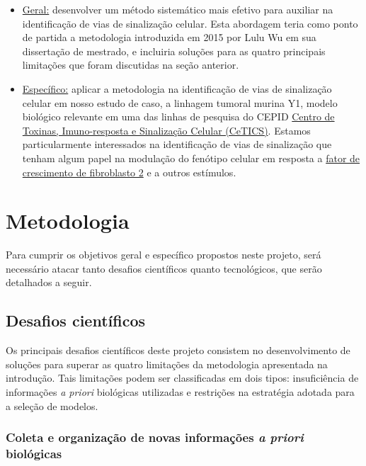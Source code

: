 \documentclass[12pt]{article}
\begin{document}
\begin{itemize}

\item \underline{Geral:} desenvolver um método sistemático mais efetivo para auxiliar na identificação de vias de sinalização celular. Esta abordagem teria como ponto de partida a metodologia introduzida em 2015 por Lulu Wu em sua dissertação de mestrado, e incluiria soluções para as quatro principais limitações que foram discutidas na seção anterior.

\item \underline{Específico:} aplicar a metodologia na identificação de vias de sinalização celular em nosso estudo de caso, a linhagem tumoral murina Y1, modelo biológico relevante em uma das linhas de pesquisa do CEPID \href{http://cetics.butantan.gov.br/}{Centro de Toxinas, Imuno-resposta e Sinalização Celular (CeTICS)}. Estamos particularmente interessados na identificação de vias de sinalização que tenham algum papel na modulação do fenótipo celular em resposta a \href{https://en.wikipedia.org/wiki/Basic\_fibroblast\_growth\_factor}{fator de crescimento de fibroblasto 2} e a outros estímulos.

\end{itemize}


\section{Metodologia}

Para cumprir os objetivos geral e específico propostos neste projeto, será necessário atacar tanto desafios científicos quanto tecnológicos, que serão detalhados a seguir.

\subsection{Desafios científicos}

Os principais desafios científicos deste projeto consistem no desenvolvimento de soluções para superar as quatro limitações da metodologia apresentada na introdução. Tais limitações podem ser classificadas em dois tipos: insuficiência de informações {\em a priori} biológicas utilizadas e restrições na estratégia adotada para a seleção de modelos.


\subsubsection{Coleta e organização de novas informações {\em a priori} biológicas}
\end{document}
